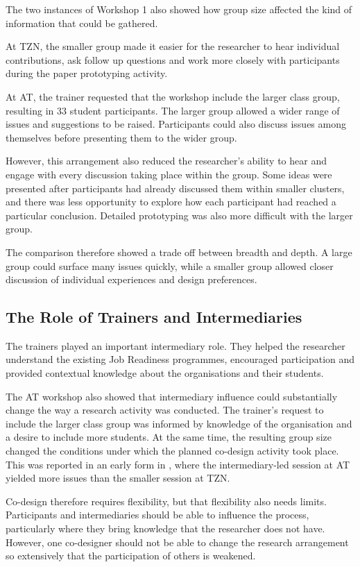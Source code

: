 The two instances of Workshop 1 also showed how group size affected the kind of information that could be gathered.

At TZN, the smaller group made it easier for the researcher to hear individual contributions, ask follow up questions and work more closely with participants during the paper prototyping activity.

At AT, the trainer requested that the workshop include the larger class group, resulting in 33 student participants. The larger group allowed a wider range of issues and suggestions to be raised. Participants could also discuss issues among themselves before presenting them to the wider group.

However, this arrangement also reduced the researcher's ability to hear and engage with every discussion taking place within the group. Some ideas were presented after participants had already discussed them within smaller clusters, and there was less opportunity to explore how each participant had reached a particular conclusion. Detailed prototyping was also more difficult with the larger group.

The comparison therefore showed a trade off between breadth and depth. A large group could surface many issues quickly, while a smaller group allowed closer discussion of individual experiences and design preferences.


\subsection{The Role of Trainers and Intermediaries}

The trainers played an important intermediary role. They helped the researcher understand the existing Job Readiness programmes, encouraged participation and provided contextual knowledge about the organisations and their students.

The AT workshop also showed that intermediary influence could substantially change the way a research activity was conducted. The trainer's request to include the larger class group was informed by knowledge of the organisation and a desire to include more students. At the same time, the resulting group size changed the conditions under which the planned co-design activity took place. This was reported in an early form in \cite{jegede2016codesign}, where the intermediary-led session at AT yielded more issues than the smaller session at TZN.

Co-design therefore requires flexibility, but that flexibility also needs limits. Participants and intermediaries should be able to influence the process, particularly where they bring knowledge that the researcher does not have. However, one co-designer should not be able to change the research arrangement so extensively that the participation of others is weakened.

